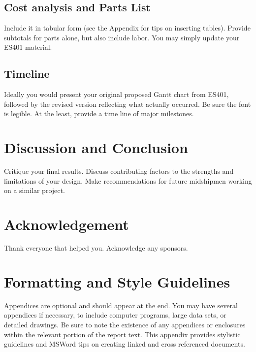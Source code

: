 \documentclass{wsecapstone}
\newcommand{\myroot}{../}
\begin{document}
\subsection{Cost analysis and Parts List}
Include it in tabular form (see the Appendix for tips on inserting tables).  Provide subtotals for parts alone, but also include labor.  You may simply update your ES401 material.

\subsection{Timeline}
Ideally you would present your original proposed Gantt chart from ES401, followed by the revised version reflecting what actually occurred.   Be sure the font is legible.  At the least, provide a time line of major milestones.







\section{Discussion and Conclusion}
Critique your final results. Discuss contributing factors to the strengths and limitations of your design. 
Make recommendations for future midshipmen working on a similar project.




\section*{Acknowledgement}
Thank everyone that helped you. Acknowledge any sponsors. 

\nocite{*}





\clearpage
\appendix
\section{Formatting and Style Guidelines}
Appendices are optional and should appear at the end. You may have several appendices if necessary, to include computer programs, large data sets, or detailed drawings. Be sure to note the existence of any appendices or enclosures within the relevant portion of the report text.  
This appendix provides stylistic guidelines and MSWord tips on creating linked and cross referenced documents.  
\end{document}
